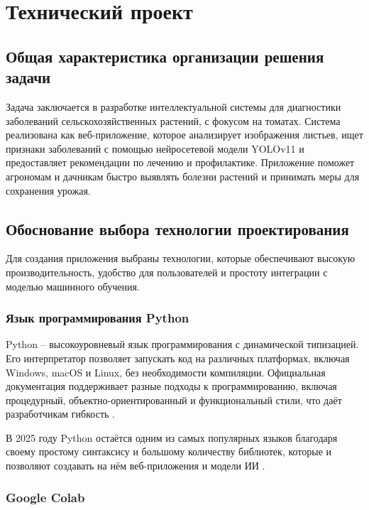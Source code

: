 \section{Технический проект}
\subsection{Общая характеристика организации решения задачи}

Задача заключается в разработке интеллектуальной системы для диагностики заболеваний сельскохозяйственных растений, с фокусом на томатах. Система реализована как веб-приложение, которое анализирует изображения листьев, ищет признаки заболеваний с помощью нейросетевой модели YOLOv11 и предоставляет рекомендации по лечению и профилактике. Приложение поможет агрономам и дачникам быстро выявлять болезни растений и принимать меры для сохранения урожая.

\subsection{Обоснование выбора технологии проектирования}

Для создания приложения выбраны технологии, которые обеспечивают высокую производительность, удобство для пользователей и простоту интеграции с моделью машинного обучения.

\subsubsection{Язык программирования Python}

Python -- высокоуровневый язык программирования с динамической типизацией. Его интерпретатор позволяет запускать код на различных платформах, включая Windows, macOS и Linux, без необходимости компиляции. Официальная документация поддерживает разные подходы к программированию, включая процедурный, объектно-ориентированный и функциональный стили, что даёт разработчикам гибкость\cite{python2} \cite{python3}. 

В 2025 году Python остаётся одним из самых популярных языков благодаря своему простому синтаксису и большому количеству  библиотек, которые и позволяют создавать на нём веб-приложения и модели ИИ \cite{python4}\cite{python1}.

\subsubsection{Google Colab}

